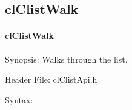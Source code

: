 \begin{flushleft}
\subsection{clClistWalk}
\hypertarget{pagecl111}{}\paragraph{cl\-Clist\-Walk}\label{pagecl111}
\begin{Desc}
\item[Synopsis:]Walks through the list.\end{Desc}
\begin{Desc}
\item[Header File:]clClistApi.h\end{Desc}
\begin{Desc}
\item[Syntax:]


\end{Desc}
\end{flushleft}
